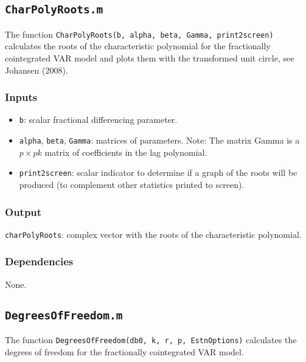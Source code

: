 \documentclass[12pt]{article}
\begin{document}
\newpage

\subsection{\texttt{CharPolyRoots.m}}

The function \texttt{CharPolyRoots(b, alpha, beta, Gamma, print2screen)} calculates the roots of the characteristic polynomial for the fractionally cointegrated VAR model and plots them with the transformed unit circle, see Johansen (2008).

\subsubsection*{Inputs}

\begin{itemize}
\item \texttt{b}: scalar fractional differencing parameter. 

\item  \texttt{alpha}, \texttt{beta}, \texttt{Gamma}: matrices of parameters. Note: The matrix Gamma is a $p \times pk$ matrix of coefficients in the lag polynomial.

\item \texttt{print2screen}: scalar indicator to determine if a graph of the roots will be produced (to complement other statistics printed to screen).

\end{itemize}


\subsubsection*{Output}

\texttt{charPolyRoots}: complex vector with the roots of the characteristic polynomial. 


\subsubsection*{Dependencies}

None.




\newpage

\subsection{\texttt{DegreesOfFreedom.m}}

The function \texttt{DegreesOfFreedom(db0, k, r, p, EstnOptions)} calculates the degrees of freedom for the fractionally cointegrated VAR model. 
\end{document}
